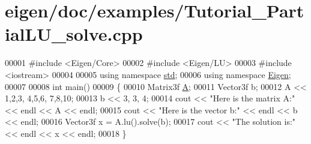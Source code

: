 \hypertarget{eigen_2doc_2examples_2_tutorial___partial_l_u__solve_8cpp_source}{}\section{eigen/doc/examples/\+Tutorial\+\_\+\+Partial\+L\+U\+\_\+solve.cpp}
\label{eigen_2doc_2examples_2_tutorial___partial_l_u__solve_8cpp_source}

\begin{DoxyCode}
00001 \textcolor{preprocessor}{#include <Eigen/Core>}
00002 \textcolor{preprocessor}{#include <Eigen/LU>}
00003 \textcolor{preprocessor}{#include <iostream>}
00004 
00005 \textcolor{keyword}{using namespace }\hyperlink{namespacestd}{std};
00006 \textcolor{keyword}{using namespace }\hyperlink{namespace_eigen}{Eigen};
00007 
00008 \textcolor{keywordtype}{int} main()
00009 \{
00010    Matrix3f \hyperlink{group___core___module_class_eigen_1_1_matrix}{A};
00011    Vector3f b;
00012    A << 1,2,3,  4,5,6,  7,8,10;
00013    b << 3, 3, 4;
00014    cout << \textcolor{stringliteral}{"Here is the matrix A:"} << endl << A << endl;
00015    cout << \textcolor{stringliteral}{"Here is the vector b:"} << endl << b << endl;
00016    Vector3f x = A.lu().solve(b);
00017    cout << \textcolor{stringliteral}{"The solution is:"} << endl << x << endl;
00018 \}
\end{DoxyCode}

